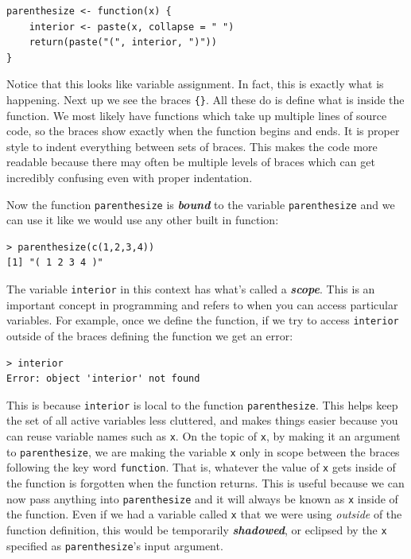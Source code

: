 \documentclass[12pt]{article}
\theoremstyle{remark}
\newcommand{\vocab}[1]{\textbf{\emph{#1}}}
\begin{document}
\begin{Verbatim}[frame=single, fontsize=\small]
parenthesize <- function(x) {
	interior <- paste(x, collapse = " ")
	return(paste("(", interior, ")"))	
}
\end{Verbatim}
Notice that this looks like variable assignment. In fact, this is exactly what is happening. Next up we see the braces \verb|{}|. All these do is define what is inside the function. We most likely have functions which take up multiple lines of source code, so the braces show exactly when the function begins and ends. It is proper style to indent everything between sets of braces. This makes the code more readable because there may often be multiple levels of braces which can get incredibly confusing even with proper indentation.

Now the function \verb|parenthesize| is \vocab{bound} to the variable \verb|parenthesize| and we can use it like we would use any other built in function:
\begin{verbatim}
> parenthesize(c(1,2,3,4))
[1] "( 1 2 3 4 )"
\end{verbatim}

The variable \verb|interior| in this context has what's called a \vocab{scope}. This is an important concept in programming and refers to when you can access particular variables. For example, once we define the function, if we try to access \verb|interior| outside of the braces defining the function we get an error:
\begin{verbatim}
> interior
Error: object 'interior' not found
\end{verbatim}
This is because \verb|interior| is local to the function \verb|parenthesize|. This helps keep the set of all active variables less cluttered, and makes things easier because you can reuse variable names such as \verb|x|. On the topic of \verb|x|, by making it an argument to \verb|parenthesize|, we are making the variable \verb|x| only in scope between the braces following the key word \verb|function|. That is, whatever the value of \verb|x| gets inside of the function is forgotten when the function returns. This is useful because we can now pass anything into \verb|parenthesize| and it will always be known as \verb|x| inside of the function. Even if we had a variable called \verb|x| that we were using \emph{outside} of the function definition, this would be temporarily \vocab{shadowed}, or eclipsed by the \verb|x| specified as \verb|parenthesize|'s input argument.

\end{document}
